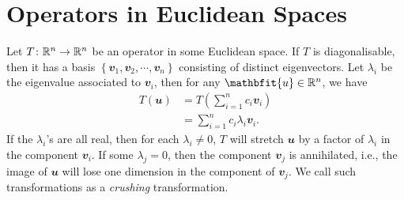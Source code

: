 \documentclass[math, code]{amznotes}
\theoremstyle{remark}
\begin{document}
\section{Operators in Euclidean Spaces}
Let $T \colon \mathbb{R}^n \to \mathbb{R}^n$ be an operator in some Euclidean space. If $T$ is diagonalisable, then it has a basis $\left\{\mathbfit{v}_1, \mathbfit{v}_2, \cdots, \mathbfit{v}_n\right\}$ consisting of distinct eigenvectors. Let $\lambda_i$ be the eigenvalue associated to $\mathbfit{v}_i$, then for any $\mathbfit{u} \in \R^n$, we have 
\begin{align*}
    T(\mathbfit{u}) & = T\left(\sum_{i = 1}^{n}c_i\mathbfit{v}_i\right) \\
    & = \sum_{i = 1}^{n}c_i\lambda_i\mathbfit{v}_i.
\end{align*}
If the $\lambda_i$'s are all real, then for each $\lambda_i \neq 0$, $T$ will stretch $\mathbfit{u}$ by a factor of $\lambda_i$ in the component $\mathbfit{v}_i$. If some $\lambda_j = 0$, then the component $\mathbfit{v}_j$ is annihilated, i.e., the image of $\mathbfit{u}$ will lose one dimension in the component of $\mathbfit{v}_j$. We call such transformations as a \textit{crushing} transformation.
\end{document}
